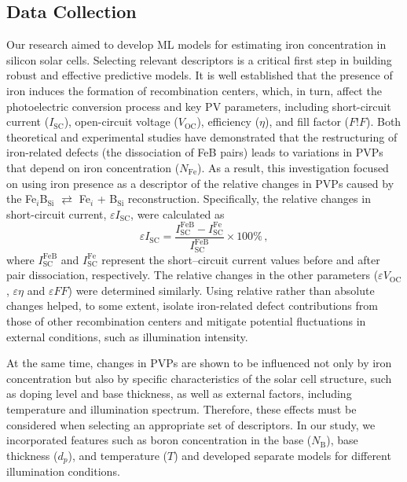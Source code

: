 \documentclass[a4paper,fleqn]{cas-sc}
\begin{document}
\subsection{Data Collection}

Our research aimed to develop ML models for estimating iron concentration in silicon solar cells.
Selecting relevant descriptors is a critical first step in building robust and effective predictive models.
It is well established that the presence of iron induces the formation of recombination centers, which, in turn, affect the photoelectric conversion process and key PV parameters, including short-circuit current ($I_\mathrm{SC}$), open-circuit voltage ($V_\mathrm{OC}$), efficiency ($\eta$), and fill factor ($F!F$).
Both theoretical and experimental studies \cite{FeB:Schmidt,IronSC,Olikh2025MSEB} have demonstrated that the restructuring of iron-related defects (the dissociation of FeB pairs) leads to variations in PVPs that depend on iron concentration ($N_\mathrm{Fe}$).
As a result, this investigation focused on using iron presence as a descriptor of the relative changes in PVPs caused by the 
Fe$_i$B$_\mathrm{Si}$ $\rightleftarrows$ Fe$_i$ + B$_\mathrm{Si}$ reconstruction. 
Specifically, the relative changes in short-circuit current, $\varepsilon I_\mathrm{SC}$, were calculated as
\begin{equation}
\label{eq1}
    \varepsilon I_\mathrm{SC} = \frac{I_\mathrm{SC}^\mathrm{FeB} - I_\mathrm{SC}^\mathrm{Fe}}{I_\mathrm{SC}^\mathrm{FeB}} \times 100 \%\,,
\end{equation}
where $I_\mathrm{SC}^\mathrm{FeB}$ and $I_\mathrm{SC}^\mathrm{Fe}$ represent the short--circuit current values before and after pair dissociation, respectively.
The relative changes in the other parameters ($\varepsilon V_\mathrm{OC}$, $\varepsilon \eta$ and $\varepsilon F\!F$) were determined similarly.
Using relative rather than absolute changes helped, to some extent, 
isolate iron-related defect contributions from those of other recombination centers 
and mitigate potential fluctuations in external conditions, such as illumination intensity.

At the same time, changes in PVPs are shown \cite{FeB:Schmidt,Olikh2025MSEB} to be influenced not only by iron concentration 
but also by specific characteristics of the solar cell structure, such as doping level and base thickness, 
as well as external factors, including temperature and illumination spectrum.
Therefore, these effects must be considered when selecting an appropriate set of descriptors.
In our study, we incorporated features such as boron concentration in the base ($N_\mathrm{B}$), base thickness ($d_p$), and temperature ($T$) 
and developed separate models for different illumination conditions.
\end{document}
